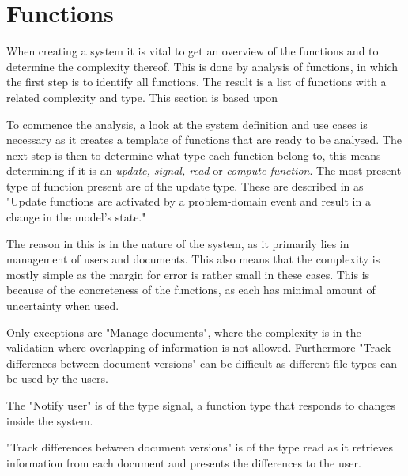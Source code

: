 \section{Functions}
When creating a system it is vital to get an overview of the functions and to determine the complexity thereof.
This is done by analysis of functions, in which the first step is to identify all functions.
The result is a list of functions with a related complexity and type.
This section is based upon\citep[ch.~7]{Rod-Aalborg}

To commence the analysis, a look at the system definition and use cases is necessary as it creates a template of functions that are ready to be analysed.
The next step is then to determine what type each function belong to, this means determining if it is an \textit{update, signal, read} or \textit{compute function}.
The most present type of function present are of the update type.
These are described in \citep[p.~140]{Rod-Aalborg}
as "Update functions are activated by a problem-domain event and result in a change in the model's state."\citep[p.~140]{Rod-Aalborg}

The reason in this is in the nature of the system, as it primarily lies in management of users and documents.
This also means that the complexity is mostly simple as the margin for error is rather small in these cases. This is because of the concreteness of the functions, as each has minimal amount of uncertainty when used.

Only exceptions are "Manage documents", where the complexity is in the validation where overlapping of information is not allowed.
Furthermore "Track differences between document versions" can be difficult as different file types can be used by the users.

The "Notify user" is of the type signal, a function type that responds to changes inside the system.

"Track differences between document versions" is of the type read as it retrieves information from each document and presents the differences to the user.


